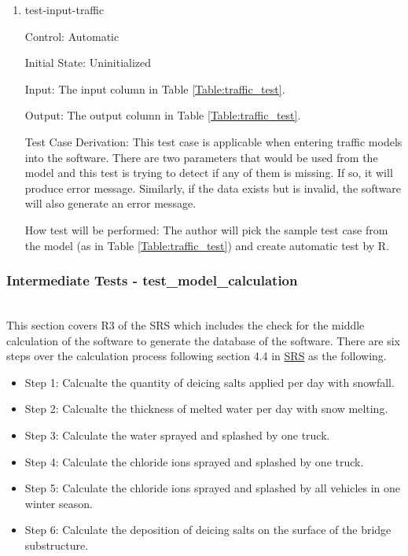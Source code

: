 \documentclass[12pt, titlepage]{article}
\begin{document}
\begin{enumerate}
\item{test-input-traffic\\}

Control: Automatic
					
Initial State: Uninitialized

Input: The input column in Table \ref{Table:traffic_test}.
					
Output: The output column in Table \ref{Table:traffic_test}. 

Test Case Derivation: This test case is applicable when entering traffic models into the software. There are two parameters that would be used from the model and this test is trying to detect if any of them is missing. If so, it will produce error message. Similarly, if the data exists but is invalid, the software will also generate an error message.
					
How test will be performed: The author will pick the sample test case from the model (as in Table \ref{Table:traffic_test}) and create automatic test by R.
\end{enumerate}



\subsubsection{Intermediate Tests - test\_model\_calculation}\label{t_calculation}
\\
This section covers R3 of the SRS which includes the check for the middle calculation of the software to generate the database of the software. There are six steps over the calculation process following section 4.4 in \href{https://github.com/CynthiaLiu0805/BridgeCorrosion/blob/main/docs/SRS/SRS.pdf}{SRS} as the following.
\begin{itemize}
\item Step 1: Calcualte the quantity of deicing salts applied per day with snowfall.
\item Step 2: Calcualte the thickness of melted water per day with snow melting.
\item Step 3: Calculate the water sprayed and splashed by one truck.
\item Step 4: Calculate the chloride ions sprayed and splashed by one truck.
\item Step 5: Calculate the chloride ions sprayed and splashed by all vehicles in one winter season.
\item Step 6: Calculate the deposition of deicing salts on the surface of the bridge substructure.
\end{itemize}
\end{document}
